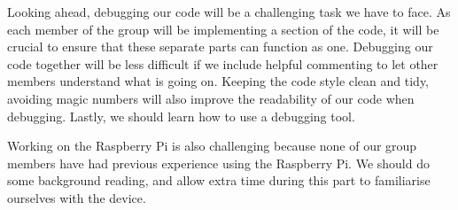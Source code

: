 \documentclass[11pt]{article}
\begin{document}
Looking ahead, debugging our code will be a challenging task we have to face. As each member of the group will be implementing a section of the code, it will be crucial to ensure that these separate parts can function as one. Debugging our code together will be less difficult if we include helpful commenting to let other members understand what is going on. Keeping the code style clean and tidy, avoiding magic numbers will also improve the readability of our code when debugging. Lastly, we should learn how to use a debugging tool.

\medskip

Working on the Raspberry Pi is also challenging because none of our group members have had previous experience using the Raspberry Pi. We should do some background reading, and allow extra time during this part to familiarise ourselves with the device.
\end{document}
